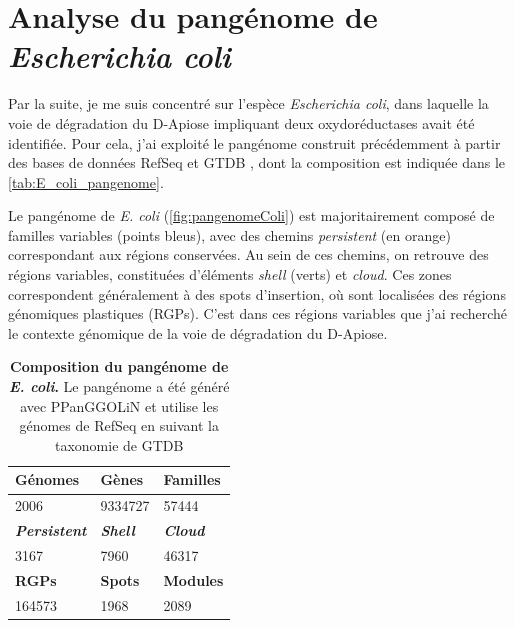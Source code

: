 \newpage

\section{Analyse du pangénome de \textit{Escherichia coli}}

Par la suite, je me suis concentré sur l’espèce \textit{Escherichia coli}, dans laquelle la voie de dégradation du D-Apiose impliquant deux oxydoréductases avait été identifiée. Pour cela, j'ai exploité le pangénome construit précédemment à partir des bases de données RefSeq et GTDB \cite{pruitt_ncbi_2007,parks_standardized_2018}, dont la composition est indiquée dans le \autoref{tab:E_coli_pangenome}.

Le pangénome de \textit{E. coli} (\autoref{fig:pangenomeColi}) est majoritairement composé de familles variables (points bleus), avec des chemins \textit{persistent} (en orange) correspondant aux régions conservées. Au sein de ces chemins, on retrouve des régions variables, constituées d’éléments \textit{shell} (verts) et \textit{cloud}. Ces zones correspondent généralement à des spots d’insertion, où sont localisées des régions génomiques plastiques (RGPs). C’est dans ces régions variables que j'ai recherché le contexte génomique de la voie de dégradation du D-Apiose.


\begin{table}[htbp]
    \centering
    \begin{tabular}{|l|l|l|}
    \hline
    \textbf{Génomes} & \textbf{Gènes} & \textbf{Familles} \\
    \hline
    2006 & 9334727 & 57444 \\
    \hline
    \hline
    \textit{\textbf{Persistent}} & \textit{\textbf{Shell}} & \textit{\textbf{Cloud}} \\
    \hline
    3167 & 7960 & 46317\\
    \hline
    \hline
    \textbf{RGPs} & \textbf{Spots} & \textbf{Modules} \\
    \hline
    164573 & 1968 & 2089 \\
    \hline
    \end{tabular}
    \caption[Composition du pangénome de \textit{E. coli}]{\textbf{Composition du pangénome de \textit{E. coli}.} Le pangénome a été généré avec PPanGGOLiN et utilise les génomes de RefSeq \cite{pruitt_ncbi_2007} en suivant la taxonomie de GTDB \cite{parks_standardized_2018}}
    \label{tab:E_coli_pangenome}
\end{table}

